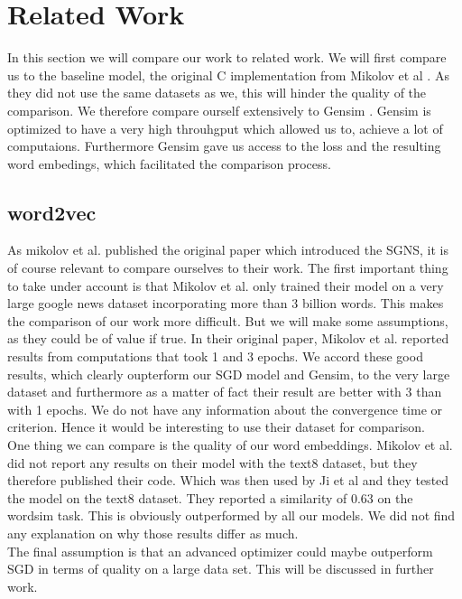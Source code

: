 \section{Related Work}
In this section we will compare our work to related work. We will first compare us to the baseline model, the original C implementation from Mikolov et al \cite{Mikolov}. As they did not use the same datasets as we, this will hinder the quality of the comparison. We therefore compare ourself extensively to Gensim \cite{gensim}. Gensim is optimized to have a very high throuhgput which allowed us to, achieve a lot of computaions. Furthermore Gensim gave us access to the loss and the resulting word embedings, which facilitated the comparison process. 

\subsection{word2vec}

As mikolov et al. published the original paper which introduced the SGNS, it is of course relevant to compare ourselves to their work. The first important thing to take under account is that Mikolov et al. only trained their model on a very large google news dataset incorporating more than 3 billion words. This makes the comparison of our work more difficult. But we will make some assumptions, as they could be of value if true. 
In their original paper, Mikolov et al. reported results from computations that took 1 and 3 epochs. We accord these good results, which clearly oupterform our SGD model and Gensim, to the very large dataset  and furthermore as a matter of fact their result are better with 3 than with 1 epochs. We do not have any information about the convergence time or criterion. Hence it would be interesting to use their dataset for comparison. \\
One thing we can compare is the quality of our word embeddings. Mikolov et al. did not report any results on their model with the text8 dataset, but they therefore published their code. Which was then used by Ji et al \cite{intel} and they tested the model on the text8 dataset. They reported a similarity of 0.63 on the wordsim task. This is obviously outperformed by all our models. We did not find any explanation on why those results differ as much. \\
The final assumption is that an advanced optimizer could maybe outperform SGD in terms of quality on a large data set. This will be discussed in further work.
 



